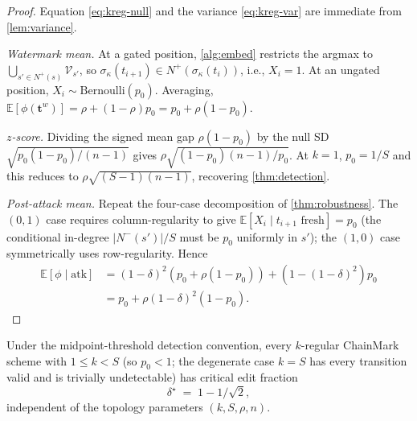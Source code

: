 \begin{proof}
  Equation \eqref{eq:kreg-null} and the variance
  \eqref{eq:kreg-var} are immediate from \autoref{lem:variance}.

  \emph{Watermark mean.}  At a gated position,
  \autoref{alg:embed} restricts the argmax to $\bigcup_{s' \in
    N^+(s)} \mathcal{V}_{s'}$, so $\sigma_\kappa(t_{i+1}) \in
  N^+(\sigma_\kappa(t_i))$, i.e., $X_i = 1$.  At an ungated position, $X_i
  \sim \mathrm{Bernoulli}(p_0)$.  Averaging,
  $\mathbb{E}[\phi(\mathbf{t}^w)] = \rho + (1-\rho) p_0 = p_0 +
  \rho (1-p_0)$.

  \emph{$z$-score.}  Dividing the signed mean gap $\rho(1-p_0)$ by
  the null SD $\sqrt{p_0(1-p_0)/(n-1)}$ gives
  $\rho \sqrt{(1-p_0)(n-1)/p_0}$.  At $k=1$, $p_0 = 1/S$ and this
  reduces to $\rho \sqrt{(S{-}1)(n{-}1)}$, recovering
  \autoref{thm:detection}.

  \emph{Post-attack mean.}  Repeat the four-case decomposition of
  \autoref{thm:robustness}.  The $(0,1)$ case requires column-regularity
  to give $\mathbb{E}[X_i \mid t_{i+1}\text{ fresh}] = p_0$
  (the conditional in-degree $|N^-(s')|/S$ must be $p_0$ uniformly in
  $s'$); the $(1,0)$ case symmetrically uses row-regularity.  Hence
  \begin{align*}
    \mathbb{E}[\phi \mid \mathrm{atk}]
      &= (1-\delta)^2 (p_0 + \rho(1-p_0)) + (1 - (1-\delta)^2) p_0 \\
      &= p_0 + \rho (1-\delta)^2 (1 - p_0).
  \end{align*}
\end{proof}


\begin{corollary}
  \label{cor:universal-delta}
  Under the midpoint-threshold detection convention, every
  $k$-regular ChainMark scheme with $1 \leq k < S$ (so $p_0 < 1$;
  the degenerate case $k=S$ has every transition valid and is
  trivially undetectable) has critical edit fraction
  \[
    \delta^\star \;=\; 1 - 1/\sqrt{2},
  \]
  independent of the topology parameters $(k, S, \rho, n)$.
\end{corollary}

